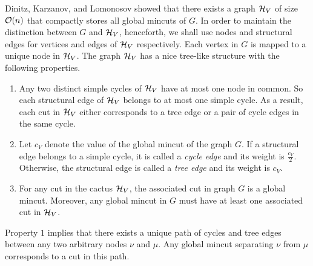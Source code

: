 Dinitz, Karzanov, and Lomonosov \cite{DL76} showed that there exists a graph ${\cal H}_V$ of size ${\cal O}(n)$ that compactly stores all global mincuts of $G$. 
In order to maintain the distinction between $G$ and ${\cal H}_V$,
henceforth, we shall use nodes and structural edges for vertices and edges of ${\cal H}_V$ respectively.  Each vertex in $G$ is mapped to a unique node in ${\cal H}_V$.
The graph ${\cal H}_V$ has a nice tree-like structure with the following properties.
\begin{enumerate}
    \item Any two distinct simple cycles of ${\cal H}_V$ have at most one node in common. So each structural edge of ${\cal H}_V$ belongs to at most one simple cycle. As a result, each cut in ${\cal H}_V$ either corresponds to a tree edge or a pair of cycle edges in the same cycle.
    \item Let $c_V$ denote the value of the global mincut of the graph $G$. If a structural edge belongs to a simple cycle, it is called a \textit{cycle edge} and its weight is $\frac{c_V}{2}$. Otherwise, the structural edge is called a \textit{tree edge} and its weight is $c_V$.
    \item For any cut in the cactus ${\cal H}_V$, the associated cut in graph $G$ is a global mincut. Moreover, any global mincut in $G$ must have at least one associated cut in ${\cal H}_V$.
\end{enumerate}


Property $1$ implies that there exists a unique path of cycles and tree edges between any two arbitrary nodes $\nu$ and $\mu$. Any global mincut separating $\nu$ from $\mu$ corresponds to a cut in this path.

